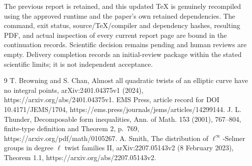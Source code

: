\documentclass[10pt]{article}
\begin{document}
The previous report is retained, and this updated TeX is genuinely recompiled using the approved runtime and the paper’s own retained dependencies. The command, exit status, source/TeX/compiler and dependency hashes, resulting PDF, and actual inspection of every current report page are bound in the continuation records. Scientific decision remains pending and human reviews are empty. Delivery completion records an initial-review package within the stated scientific limits; it is not independent acceptance.\par
9 T. Browning and S. Chan, Almost all quadratic twists of an elliptic curve have no integral points, arXiv:2401.04375v1 (2024), https://arxiv.org/abs/2401.04375v1. EMS Press, article record for DOI 10.4171/JEMS/1704, https://ems.press/journals/jems/articles/14299144. J. L. Thunder, Decomposable form inequalities, Ann. of Math. 153 (2001), 767–804, finite-type definition and Theorem 2, p. 769, https://arxiv.org/pdf/math/0105267. A. Smith, The distribution of \(\ell^\infty\)-Selmer groups in degree \(\ell\) twist families II, arXiv:2207.05143v2 (8 February 2023), Theorem 1.1, https://arxiv.org/abs/2207.05143v2.\par
\end{document}
